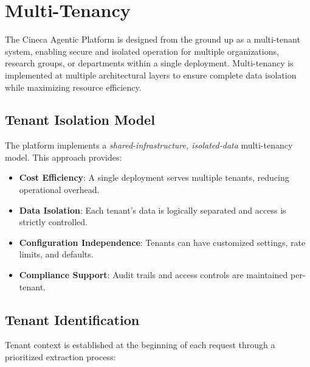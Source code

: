 
\section{Multi-Tenancy}
\label{sec:multi-tenancy}

The Cineca Agentic Platform is designed from the ground up as a multi-tenant system, enabling secure and isolated operation for multiple organizations, research groups, or departments within a single deployment. Multi-tenancy is implemented at multiple architectural layers to ensure complete data isolation while maximizing resource efficiency.

\subsection{Tenant Isolation Model}
\label{subsec:tenant-isolation-model}

The platform implements a \textit{shared-infrastructure, isolated-data} multi-tenancy model. This approach provides:

\begin{itemize}
    \item \textbf{Cost Efficiency}: A single deployment serves multiple tenants, reducing operational overhead.
    \item \textbf{Data Isolation}: Each tenant's data is logically separated and access is strictly controlled.
    \item \textbf{Configuration Independence}: Tenants can have customized settings, rate limits, and defaults.
    \item \textbf{Compliance Support}: Audit trails and access controls are maintained per-tenant.
\end{itemize}

\subsection{Tenant Identification}
\label{subsec:tenant-identification}

Tenant context is established at the beginning of each request through a prioritized extraction process:

